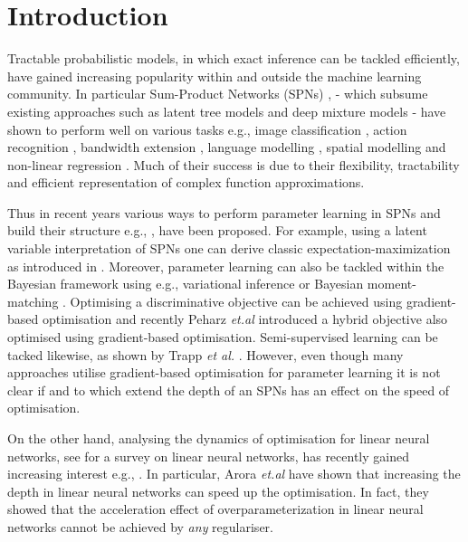\documentclass{article}
\begin{document}
\section{Introduction}
\label{introduction}
Tractable probabilistic models, in which exact inference can be tackled efficiently, have gained increasing popularity within and outside the machine learning community.
In particular Sum-Product Networks (SPNs) \cite{Poon2011a}, - which subsume existing approaches such as latent tree models and deep mixture models \cite{Jaini2018} - have shown to perform well on various tasks e.g., image classification \cite{Gens2012, Peharz2018}, action recognition \cite{Amer2016}, bandwidth extension \cite{Peharz2014}, language modelling \cite{Cheng2014}, spatial modelling \cite{Pronobis2017} and non-linear regression \cite{Trapp2018}.
Much of their success is due to their flexibility, tractability and efficient representation of complex function approximations.

Thus in recent years various ways to perform parameter learning in SPNs and build their structure e.g., \cite{Gens2013,Vergari2015}, have been proposed.
For example, using a latent variable interpretation of SPNs \cite{Poon2011a,Peharz2017} one can derive classic expectation-maximization as introduced in \cite{Peharz2017}.
Moreover, parameter learning can also be tackled within the Bayesian framework using e.g., variational inference \cite{Zhao2016} or Bayesian moment-matching \cite{Rashwan2016}.
Optimising a discriminative objective can be achieved using gradient-based optimisation \cite{Gens2012} and recently Peharz {\it et.al} \cite{Peharz2018} introduced a hybrid objective also optimised using gradient-based optimisation.
Semi-supervised learning can be tacked likewise, as shown by Trapp {\it et al.} \cite{Trapp2017}.
However, even though many approaches utilise gradient-based optimisation for parameter learning it is not clear if and to which extend the depth of an SPNs has an effect on the speed of optimisation.

On the other hand, analysing the dynamics of optimisation for linear neural networks, see \cite{Baldi1995} for a survey on linear neural networks, has recently gained increasing interest e.g., \cite{Saxe2014,Arora2018}.
In particular, Arora {\it et.al} \cite{Arora2018} have shown that increasing the depth in linear neural networks can speed up the optimisation. In fact, they showed that the acceleration effect of overparameterization in linear neural networks cannot be achieved by \emph{any} regulariser.
\end{document}
